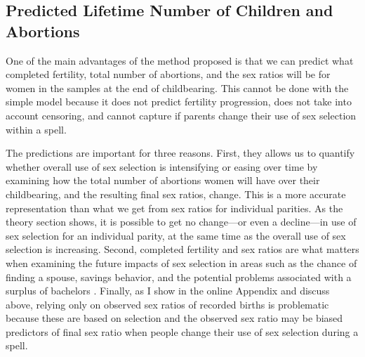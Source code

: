 \documentclass[12pt,letterpaper]{article}
\begin{document}
\subsection{Predicted Lifetime Number of Children and Abortions}

One of the main advantages of the method proposed is that we can predict what 
completed fertility, total number of abortions, and the sex ratios will be for 
women in the samples at the end of childbearing. 
This cannot be done with the simple model because it does not predict fertility
progression, does not take into account censoring, and cannot capture if parents
change their use of sex selection within a spell.

The predictions are important for three reasons.
First, they allows us to quantify whether overall use of sex selection is 
intensifying or easing over time by examining how the total number of abortions 
women will have over their childbearing, and the resulting final sex ratios, change.
This is a more accurate representation than what we get from sex ratios 
for individual parities.
As the theory section shows, it is possible to get no change---or even a 
decline---in use of sex selection for an individual parity, at the same time 
as the overall use of sex selection is increasing.
Second, completed fertility and sex ratios are what matters when examining the future 
impacts of sex selection in areas such as the chance of finding a spouse, savings 
behavior, and the potential problems associated with a surplus of bachelors 
\citep{lancaster02,Ding2009,Wei2009,Edlund2013}.
Finally, as I show in the online Appendix and discuss above, relying only on observed 
sex ratios of recorded births is problematic because these are based on selection and 
the observed sex ratio may be biased predictors of final sex ratio when people change 
their use of sex selection during a spell.

% 
% 
% 
\end{document}

